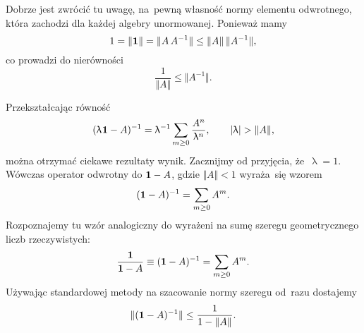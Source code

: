 \documentclass[a4paper,11pt]{article}
\renewcommand{\lambda}{\uplambda}
\begin{document}
\VerSpaceFour





\noindent
{} Dobrze jest zwrócić tu uwagę, na~pewną własność normy elementu
odwrotnego, która zachodzi dla każdej algebry unormowanej. Ponieważ mamy
\begin{equation}
  \label{eq:Bratteli-Robinson-Operator-Algebras-ETC-Vol-I-s01-27}
  1 = \Vert \mathbf{1} \Vert = \Vert A \, A^{ -1 } \Vert \leq \Vert A \Vert \, \Vert A^{ -1 } \Vert,
\end{equation}
co prowadzi do nierówności
\begin{equation}
  \label{eq:Bratteli-Robinson-Operator-Algebras-ETC-Vol-I-s01-28}
  \frac{ 1 }{ \Vert A \Vert } \leq \Vert A^{ -1 } \Vert.
\end{equation}

\VerSpaceFour





\noindent
{} Przekształcając równość
\begin{equation}
  \label{eq:Bratteli-Robinson-Operator-Algebras-ETC-Vol-I-s01-29}
  ( \lambda \HorSpaceOne \UnitAlg - A )^{ -1 } =
  \lambda^{ -1 } \sum_{ m \geq 0 } \frac{ A^{ n } }{ \lambda^{ n } }, \qquad
  | \lambda | > \Vert A \Vert,
\end{equation}
można otrzymać ciekawe rezultaty wynik. Zacznijmy od przyjęcia,
że~$\lambda = 1$. Wówczas operator odwrotny do $\mathbf{1} - A$, gdzie $\Vert A \Vert < 1$
wyraża~się wzorem
\begin{equation}
  \label{eq:Bratteli-Robinson-Operator-Algebras-ETC-Vol-I-s01-30}
  ( \mathbf{1} - A )^{ -1 } = \sum_{ m \geq 0 } A^{ m }.
\end{equation}
Rozpoznajemy tu wzór analogiczny do wyrażeni na sumę szeregu geometrycznego
liczb rzeczywistych:
\begin{equation}
  \label{eq:Bratteli-Robinson-Operator-Algebras-ETC-Vol-I-s01-31}
  \frac{ \mathbf{1} }{ \mathbf{1} - A } \equiv ( \mathbf{1} - A )^{ -1 } =
  \sum_{ m \geq 0 } A^{ m }.
\end{equation}
Używając standardowej metody na szacowanie normy szeregu od~razu dostajemy
\begin{equation}
  \label{eq:Bratteli-Robinson-Operator-Algebras-ETC-Vol-I-s01-32}
  \Vert ( \mathbf{1} - A )^{ -1 } \Vert \leq
  \frac{ 1 }{ 1 - \Vert A \Vert }.
\end{equation}
\end{document}

